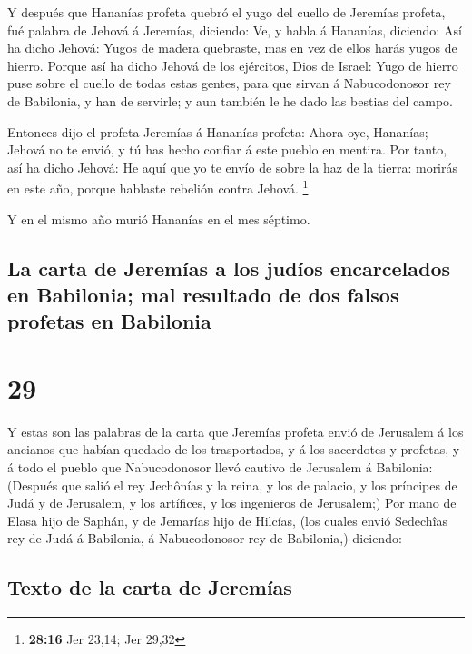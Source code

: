  Y después que Hananías profeta quebró el yugo del cuello
de Jeremías profeta, fué palabra de Jehová á Jeremías, diciendo:
 Ve, y habla á Hananías, diciendo: Así ha dicho Jehová:
Yugos de madera quebraste, mas en vez de ellos harás yugos de hierro.
 Porque así ha dicho Jehová de los ejércitos, Dios de
Israel: Yugo de hierro puse sobre el cuello de todas estas gentes, para
que sirvan á Nabucodonosor rey de Babilonia, y han de servirle; y aun
también le he dado las bestias del campo.

 Entonces dijo el profeta Jeremías á Hananías profeta:
Ahora oye, Hananías; Jehová no te envió, y tú has hecho confiar á este
pueblo en mentira.  Por tanto, así ha dicho Jehová: He
aquí que yo te envío de sobre la haz de la tierra: morirás en este año,
porque hablaste rebelión contra Jehová. \footnote{\textbf{28:16} Jer
  23,14; Jer 29,32}

 Y en el mismo año murió Hananías en el mes séptimo.

\hypertarget{la-carta-de-jeremuxedas-a-los-juduxedos-encarcelados-en-babilonia-mal-resultado-de-dos-falsos-profetas-en-babilonia}{%
\subsection{La carta de Jeremías a los judíos encarcelados en Babilonia;
mal resultado de dos falsos profetas en
Babilonia}\label{la-carta-de-jeremuxedas-a-los-juduxedos-encarcelados-en-babilonia-mal-resultado-de-dos-falsos-profetas-en-babilonia}}

\hypertarget{section-28}{%
\section{29}\label{section-28}}

 Y estas son las palabras de la carta que Jeremías profeta
envió de Jerusalem á los ancianos que habían quedado de los
trasportados, y á los sacerdotes y profetas, y á todo el pueblo que
Nabucodonosor llevó cautivo de Jerusalem á Babilonia: 
(Después que salió el rey Jechônías y la reina, y los de palacio, y los
príncipes de Judá y de Jerusalem, y los artífices, y los ingenieros de
Jerusalem;)  Por mano de Elasa hijo de Saphán, y de
Jemarías hijo de Hilcías, (los cuales envió Sedechîas rey de Judá á
Babilonia, á Nabucodonosor rey de Babilonia,) diciendo:

\hypertarget{texto-de-la-carta-de-jeremuxedas}{%
\subsection{Texto de la carta de
Jeremías}\label{texto-de-la-carta-de-jeremuxedas}}


